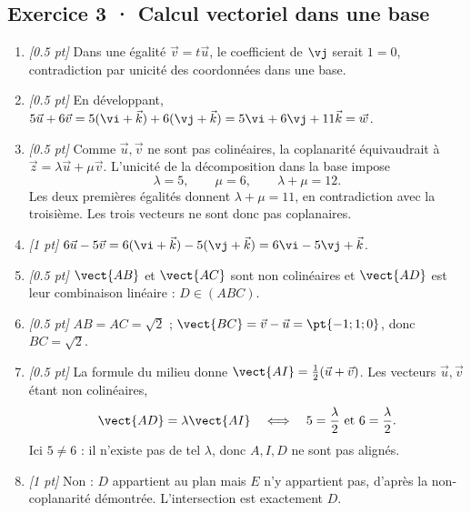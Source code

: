 \subsection*{Exercice 3 · Calcul vectoriel dans une base}\begin{enumerate}

\item \textit{[\num{0,5} pt]} Dans une égalité $\vec v=t\vec u$, le coefficient de $\vj $ serait $1=0$, contradiction par unicité des coordonnées dans une base.

\item \textit{[\num{0,5} pt]} En développant, $5\vec u+6\vec v=5(\vi +\vec k)+6(\vj +\vec k)=5\vi +6\vj +11\vec k=\vec w$.

\item \textit{[\num{0,5} pt]} Comme $\vec u,\vec v$ ne sont pas colinéaires, la coplanarité équivaudrait à $\vec z=\lambda\vec u+\mu\vec v$. L'unicité de la décomposition dans la base impose
\[\lambda=5,\qquad\mu=6,\qquad\lambda+\mu=12.\]
Les deux premières égalités donnent $\lambda+\mu=11$, en contradiction avec la troisième. Les trois vecteurs ne sont donc pas coplanaires.

\item \textit{[1 pt]} $6\vec u-5\vec v=6(\vi +\vec k)-5(\vj +\vec k)=6\vi -5\vj +\vec k$.

\item \textit{[\num{0,5} pt]} $\vect{AB}$ et $\vect{AC}$ sont non colinéaires et $\vect{AD}$ est leur combinaison linéaire : $D\in(ABC)$.

\item \textit{[\num{0,5} pt]} $AB=AC=\sqrt2$ ; $\vect{BC}=\vec v-\vec u=\pt{-1;1;0}$, donc $BC=\sqrt2$.

\item \textit{[\num{0,5} pt]} La formule du milieu donne $\vect{AI}=\frac12(\vec u+\vec v)$. Les vecteurs $\vec u,\vec v$ étant non colinéaires,
\[\vect{AD}=\lambda\vect{AI}\quad\Longleftrightarrow\quad 5=\frac{\lambda}{2}\ \text{et}\ 6=\frac{\lambda}{2}.\]
Ici $5\ne 6$ : il n'existe pas de tel $\lambda$, donc $A,I,D$ ne sont pas alignés.

\item \textit{[1 pt]} Non : $D$ appartient au plan mais $E$ n'y appartient pas, d'après la non-coplanarité démontrée. L'intersection est exactement $D$.

\end{enumerate}


